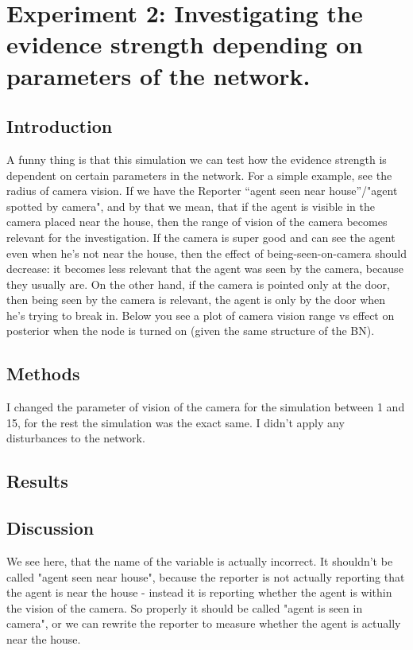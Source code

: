 \section{Experiment 2: Investigating the evidence strength depending on parameters of the network.}


\subsection{Introduction}
A funny thing is that this simulation we can test how the evidence strength is dependent on certain parameters in the network. For a simple example, see the radius of camera vision. If we have the Reporter ``agent seen near house''/"agent spotted by camera", and by that we mean, that if the agent is visible in the camera placed near the house, then the range of vision of the camera becomes relevant for the investigation. If the camera is super good and can see the agent even when he's not near the house, then the effect of being-seen-on-camera should decrease: it becomes less relevant that the agent was seen by the camera, because they usually are. On the other hand, if the camera is pointed only at the door, then being seen by the camera is relevant, the agent is only by the door when he's trying to break in. Below you see a plot of camera vision range vs effect on posterior when the node is turned on (given the same structure of the BN).

\subsection{Methods}
I changed the parameter of vision of the camera for the simulation between 1 and 15, for the rest the simulation was the exact same. I didn't apply any disturbances to the network.

\subsection{Results}



\subsection{Discussion}
We see here, that the name of the variable is actually incorrect. It shouldn't be called "agent seen near house", because the reporter is not actually reporting that the agent is near the house - instead it is reporting whether the agent is within the vision of the camera. So properly it should be called "agent is seen in camera", or we can rewrite the reporter to measure whether the agent is actually near the house. 

